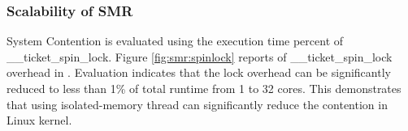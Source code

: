 %





\subsubsection{Scalability of SMR}
System Contention is evaluated using the execution time percent of \_\_ticket\_spin\_lock.
Figure \ref{fig:smr:spinlock} reports of \_\_ticket\_spin\_lock overhead in \myds.
Evaluation indicates that the lock overhead can be significantly reduced to less than 1\% of total runtime from 1 to 32 cores.
This demonstrates that using isolated-memory \myth thread can  
significantly reduce the contention in Linux kernel.



